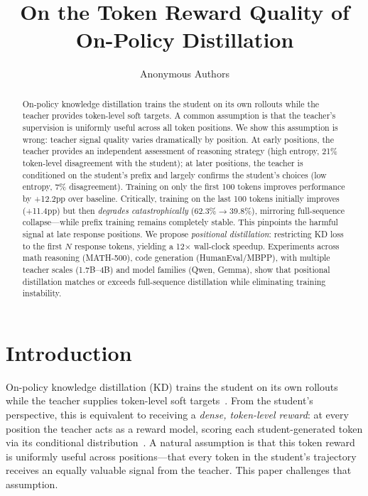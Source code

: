 \documentclass[10pt]{article}
\title{\textbf{On the Token Reward Quality of On-Policy Distillation}}
\author{
  Anonymous Authors
}
\date{}
\begin{document}
\maketitle

\begin{abstract}
On-policy knowledge distillation trains the student on its own rollouts while the teacher provides token-level soft targets. A common assumption is that the teacher's supervision is uniformly useful across all token positions. We show this assumption is wrong: teacher signal quality varies dramatically by position. At early positions, the teacher provides an independent assessment of reasoning strategy (high entropy, 21\% token-level disagreement with the student); at later positions, the teacher is conditioned on the student's prefix and largely confirms the student's choices (low entropy, 7\% disagreement). Training on only the first 100 tokens improves performance by +12.2pp over baseline. Critically, training on the last 100 tokens initially improves (+11.4pp) but then \emph{degrades catastrophically} (62.3\%$\to$39.8\%), mirroring full-sequence collapse---while prefix training remains completely stable. This pinpoints the harmful signal at late response positions. We propose \emph{positional distillation}: restricting KD loss to the first $N$ response tokens, yielding a 12$\times$ wall-clock speedup. Experiments across math reasoning (MATH-500), code generation (HumanEval/MBPP), with multiple teacher scales (1.7B--4B) and model families (Qwen, Gemma), show that positional distillation matches or exceeds full-sequence distillation while eliminating training instability.
\end{abstract}

\section{Introduction}
\label{sec:intro}

On-policy knowledge distillation (KD) trains the student on its own rollouts while the teacher supplies token-level soft targets~\citep{agarwal2024onpolicy, gu2024minillm}. From the student's perspective, this is equivalent to receiving a \emph{dense, token-level reward}: at every position the teacher acts as a reward model, scoring each student-generated token via its conditional distribution~\citep{gu2024minillm, lu2025onpolicy, yang2026beyond}. A natural assumption is that this token reward is uniformly useful across positions---that every token in the student's trajectory receives an equally valuable signal from the teacher. This paper challenges that assumption.
\end{document}
